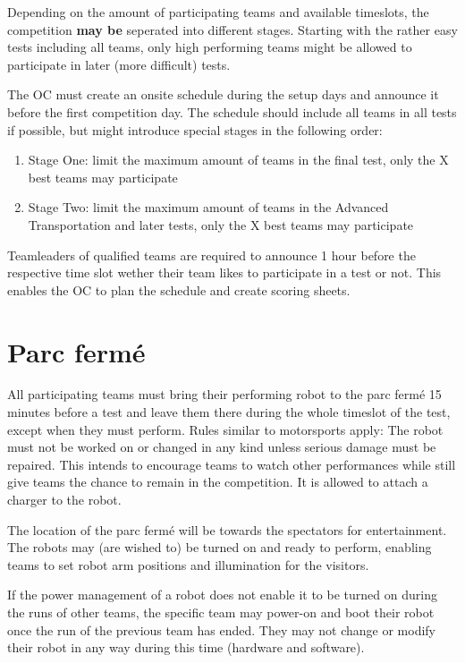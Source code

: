 Depending on the amount of participating teams and available timeslots, 
the competition \textbf{may be} seperated into different stages.
Starting with the rather easy tests including all teams, only high performing teams might be allowed to participate in later (more difficult) tests.

The OC must create an onsite schedule during the setup days and announce it before the first competition day. 
The schedule should include all teams in all tests if possible,
but might introduce special stages in the following order:
\begin{enumerate}
\item Stage One: limit the maximum amount of teams in the final test, only the X best teams may participate
\item Stage Two: limit the maximum amount of teams in the Advanced Transportation and later tests, only the X best teams may participate
\end{enumerate}

Teamleaders of qualified teams are required to announce 1 hour before the respective time slot wether their team likes to participate in a test or not. 
This enables the OC to plan the schedule and create scoring sheets.

\section{Parc ferm\'e}

All participating teams must bring their performing robot to the parc ferm\'e 15 minutes before a test and leave them there during the whole timeslot of the test, except when they must perform.
Rules similar to motorsports apply: The robot must not be worked on or changed in any kind unless
serious damage must be repaired. This intends to encourage teams to watch other performances while still give teams the chance to remain in the competition. It is allowed to attach a charger to the robot.

The location of the parc ferm\'e will be towards the spectators for entertainment.
The robots may (are wished to) be turned on and ready to perform, enabling teams to set robot arm positions and illumination for the visitors. 

If the power management of a robot does not enable it to be turned on during the runs of other teams,
the specific team may power-on and boot their robot once the run of the previous team has ended.
They may not change or modify their robot in any way during this time (hardware and software).

